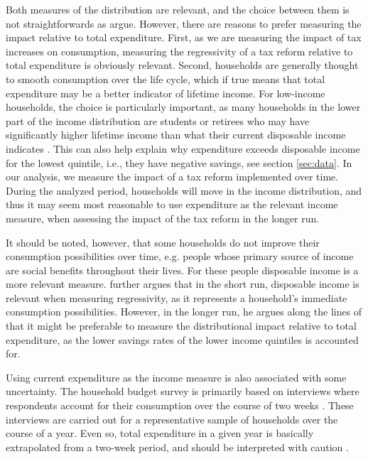 Both measures of the distribution are relevant, and the choice between them is not straightforwards as \cite{Wier2005} argue. However, there are reasons to prefer measuring the impact relative to total expenditure. First, as we are measuring the impact of tax increases on consumption, measuring the regressivity of a tax reform relative to total expenditure is obviously relevant. Second, households are generally thought to smooth consumption over the life cycle, which if true means that total expenditure may be a better indicator of lifetime income. \citep{friedman1957front,Wier2005,dmoer2009} For low-income households, the choice is particularly important, as many households in the lower part of the income distribution are students or retirees who may have significantly higher lifetime income than what their current disposable income indicates \citep{Wier2005}. This can also help explain why expenditure exceeds disposable income for the lowest quintile, i.e., they have negative savings, see section \ref{sec:data}. In our analysis, we measure the impact of a tax reform implemented over time. During the analyzed period, households will move in the income distribution, and thus it may seem most reasonable to use expenditure as the relevant income measure, when assessing the impact of the tax reform in the longer run. 

It should be noted, however, that some households do not improve their consumption possibilities over time, e.g. people whose primary source of income are social benefits throughout their lives. For these people disposable income is a more relevant measure. \cite{sune2020} further argues that in the short run, disposable income is relevant when measuring regressivity, as it represents a household's immediate consumption possibilities. However, in the longer run, he argues along the lines of \cite{Wier2005} that it might be preferable to measure the distributional impact relative to total expenditure, as the lower savings rates of the lower income quintiles is accounted for. 

Using current expenditure as the income measure is also associated with some uncertainty. The household budget survey is primarily based on interviews where respondents account for their consumption over the course of two weeks \citep{hhbudgetsurvey}. These interviews are carried out for a representative sample of households over the course of a year. Even so, total expenditure in a given year is basically extrapolated from a two-week period, and should be interpreted with caution \citep{Wier2005}.

